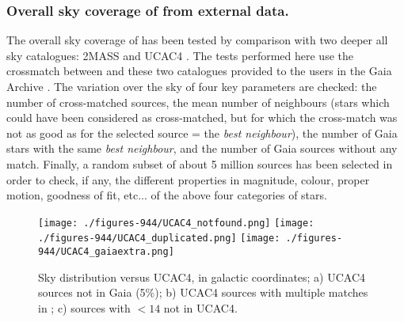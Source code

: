 \subsubsection{Overall sky coverage of {} from external data.}
The overall sky coverage of {} has been tested by comparison with two deeper all sky catalogues:  2MASS \citep{2006AJ....131.1163S} and UCAC4 \citep{2013AJ....145...44Z}. 
The tests performed here use the crossmatch between {} and these two catalogues provided to the users in the Gaia Archive \citep{DPACP-17}. The variation over the sky of four key parameters are checked: the number of cross-matched sources, the mean number of neighbours (stars which could have been considered as cross-matched, but for which the cross-match was not as good as for the selected source = the {\it best neighbour}), the number of Gaia stars with the same {\it best neighbour}, and the number of Gaia sources without any match. Finally, a random subset of about 5 million sources has been selected in order to check, if any, the different properties in magnitude, colour, proper motion, goodness of fit, etc... of the above four categories of stars.

\begin{figure*}
    \begin{center}
        \texttt{[image: ./figures-944/UCAC4\_notfound.png]}
        \texttt{[image: ./figures-944/UCAC4\_duplicated.png]}
        \texttt{[image: ./figures-944/UCAC4\_gaiaextra.png]}
        \caption[Sky distribution versus UCAC4]{Sky distribution versus UCAC4, in galactic coordinates; a) UCAC4 sources not in Gaia {} (5\%); b) UCAC4 sources with multiple matches in ; c) {} sources with \gmag$<14$ not in UCAC4. }
        \label{fig:wp944_ucac4} 
    \end{center}
\end{figure*}

